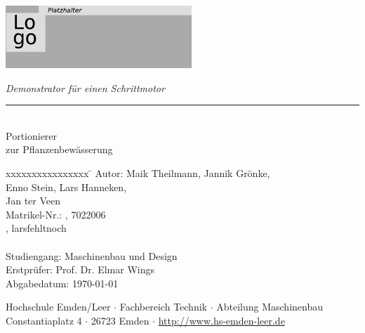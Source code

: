 %
%

\begin{titlepage}
    
    \begin{flushleft} 
        \includegraphics[width=7cm]{General/Logo.png}
    \end{flushleft} 
    
    \begin{flushright}
        \vspace{2cm}
        \LARGE \textsl{Demonstrator für einen Schrittmotor}\\
        \rule{0.6\textwidth}{0.4pt} ~\\
        \vspace{0.5cm}
        \textsf{\LARGE Portionierer}\\
        \textsf{\LARGE zur Pflanzenbewässerung}
    \end{flushright}
    
    \vspace{3cm}
    \large
    \begin{tabbing}
        xxxxxxxxxxxxxxxx \= \kill
        Autor:	\> Maik Theilmann, Jannik Grönke,\\
        		\> Enno Stein, Lars Hanneken, \\
        		\> Jan ter Veen \\
        Matrikel-Nr.:	, 7022006 \\
        				, larsfehltnoch\\
        				 \\
        Studiengang: \> Maschinenbau und Design \\ [0.5cm]
        Erstprüfer: \> Prof. Dr. Elmar Wings \\
        Abgabedatum: \> \today \\
    \end{tabbing}
    
    \vspace{3cm}
    \small
    \begin{center}
        Hochschule Emden/Leer $\cdot$ 
        Fachbereich Technik $\cdot$ 
        Abteilung Maschinenbau \\
        Constantiaplatz 4 $\cdot$ 
        26723 Emden $\cdot$ 
        \url{http://www.hs-emden-leer.de}
    \end{center}
    
\end{titlepage}
